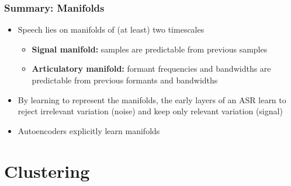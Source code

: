 \documentclass{beamer}
\begin{document}
\begin{frame}
  \frametitle{Summary: Manifolds}

  \begin{itemize}
  \item Speech lies on manifolds of (at least) two timescales
    \begin{itemize}
    \item {\bf Signal manifold:} samples are predictable from previous samples
    \item {\bf Articulatory manifold:} formant frequencies and
      bandwidths are predictable from previous formants and bandwidths
    \end{itemize}
  \item By learning to represent the manifolds, the early layers of an ASR
    learn to reject irrelevant variation (noise) and keep only relevant variation (signal)
  \item Autoencoders explicitly learn manifolds
  \end{itemize}
\end{frame}
        
\section[Clustering]{Clustering}
\setcounter{subsection}{1}
\end{document}
